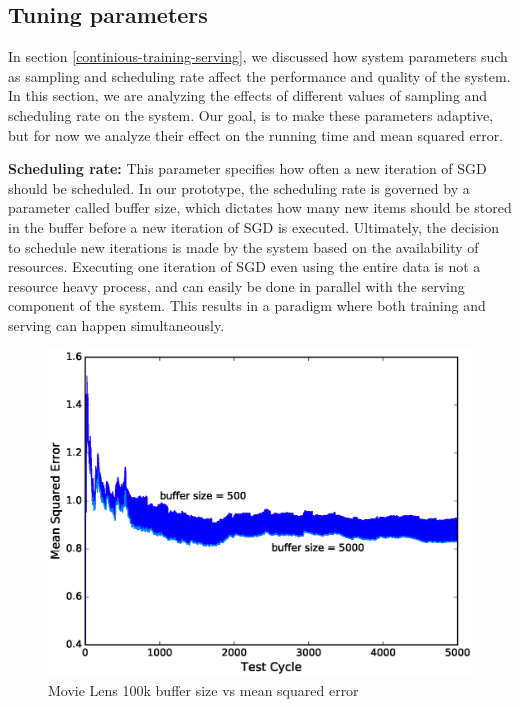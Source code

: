 \documentclass{sig-alternate-05-2015}
\begin{document}
\subsection{Tuning parameters} \label{tuning}
In section \ref{continious-training-serving}, we discussed how system parameters such as sampling and scheduling rate affect the performance and quality of the system.
In this section, we are analyzing the effects of different values of sampling and scheduling rate on the system.
Our goal, is to make these parameters adaptive, but for now we analyze their effect on the running time and mean squared error. 

\textbf{Scheduling rate:} This parameter specifies how often a new iteration of SGD should be scheduled. 
In our prototype, the scheduling rate is governed by a parameter called buffer size, which dictates how many new items should be stored in the buffer before a new iteration of SGD is executed. 
Ultimately, the decision to schedule new iterations is made by the system based on the availability of resources. 
Executing one iteration of SGD even using the entire data is not a resource heavy process, and can easily be done in parallel with the serving component of the system. 
This results in a paradigm where both training and serving can happen simultaneously. 

\begin{figure}[H]
\centering
\includegraphics[width=\columnwidth]{../images/experiment-results/movie-lens-100k-buffer-size.eps}
\caption{Movie Lens 100k buffer size vs mean squared error}
\label{fig:movie-lens-100k-buffer-size-mse}
\end{figure}
\end{document}
